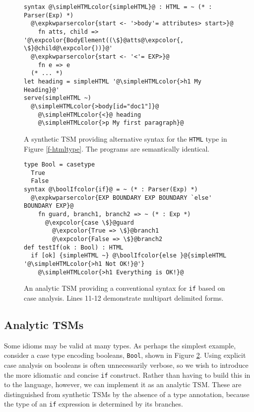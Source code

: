 \documentclass{sig-alternate}
\newcommand{\expkwparsercolor}[1]{\textcolor[HTML]{336699}{#1}}
\newcommand{\expcolor}[1]{\textcolor[HTML]{FF0033}{#1}}
\newcommand{\simpleHTMLcolor}[1]{\textcolor[HTML]{7D5100}{#1}}
\newcommand{\boolIfcolor}[1]{\textcolor[HTML]{5E0C0C}{#1}}
\newcommand{\mycaption}[1]{\vspace{-4px}\caption{#1}\vspace{-2px}}
\begin{document}


\begin{figure}[t]
\begin{lstlisting}[style=wyvern]
syntax @\simpleHTMLcolor{simpleHTML}@ : HTML = ~ (* : Parser(Exp) *)
  @\expkwparsercolor{start <- '>body'= attributes> start>}@
    fn atts, child => '@\expcolor{BodyElement((\$}@atts@\expcolor{, \$}@child@\expcolor{))}@'
  @\expkwparsercolor{start <- '<'= EXP>}@
    fn e => e
  (* ... *)
let heading = simpleHTML '@\simpleHTMLcolor{>h1 My Heading}@'
serve(simpleHTML ~)
  @\simpleHTMLcolor{>body[id="doc1"]}@
    @\simpleHTMLcolor{<}@ heading
    @\simpleHTMLcolor{>p My first paragraph}@
\end{lstlisting}
\mycaption{A synthetic TSM providing alternative syntax for the \texttt{HTML} type in Figure \ref{f-htmltype}. The programs are semantically identical.}
\label{f-simplehtml}
\end{figure}
\begin{figure}[t]
\begin{lstlisting}[style=wyvern]
type Bool = casetype 
  True
  False
syntax @\boolIfcolor{if}@ = ~ (* : Parser(Exp) *)
  @\expkwparsercolor{EXP BOUNDARY EXP BOUNDARY `else' BOUNDARY EXP}@
    fn guard, branch1, branch2 => ~ (* : Exp *)
      @\expcolor{case \$}@guard
        @\expcolor{True => \$}@branch1
        @\expcolor{False => \$}@branch2
def testIf(ok : Bool) : HTML
  if [ok] {simpleHTML ~} @\boolIfcolor{else }@{simpleHTML '@\simpleHTMLcolor{>h1 Not OK!}@'}
    @\simpleHTMLcolor{>h1 Everything is OK!}@
\end{lstlisting}
\mycaption{An analytic TSM providing a conventional syntax for \texttt{if} based on case analysis. Lines 11-12 demonstrate multipart delimited forms.}
\label{if-example}
\end{figure}

\subsection{Analytic TSMs}
Some idioms may be valid at many types. As perhaps the simplest example, consider a case type encoding booleans, \verb|Bool|, shown in Figure \ref{if-example}. Using explicit case analysis on booleans is often unnecessarily verbose, so we wish to introduce the more idiomatic and concise \verb|if| construct. Rather than having to build this in to the language, however, we can implement it as an analytic TSM. These are distinguished from synthetic TSMs by the absence of a type annotation, because the type of an \verb|if| expression is determined by its branches. 
\end{document}
